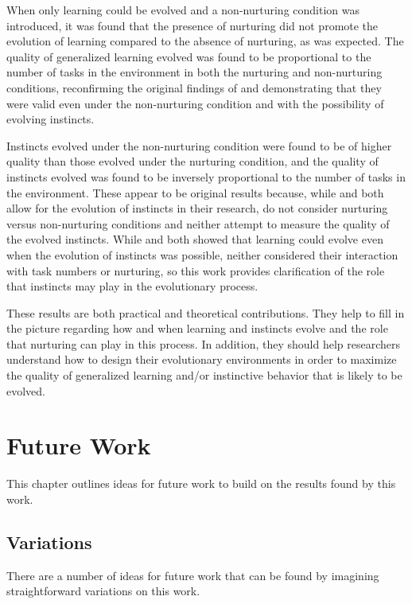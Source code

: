 \documentclass[master]{outhesis}
\begin{document}
When only learning could be evolved and a non-nurturing condition was introduced,
it was found that the presence of nurturing did not promote the evolution of learning compared to the absence of nurturing,
as was expected.
The quality of generalized learning evolved was found to be proportional to the number of tasks in the environment in both the nurturing and non-nurturing conditions,
reconfirming the original findings of \citet{Chalmers:1990aa} and demonstrating that they were valid even under the non-nurturing condition and with the possibility of evolving instincts.

Instincts evolved under the non-nurturing condition were found to be of higher quality than those evolved under the nurturing condition,
and the quality of instincts evolved was found to be inversely proportional to the number of tasks in the environment.
These appear to be original results because,
while \citet{Niv:2002aa} and \citet{Shah:2015hs} both allow for the evolution of instincts in their research,
\citeauthor{Niv:2002aa} do not consider nurturing versus non-nurturing conditions
and neither attempt to measure the quality of the evolved instincts.
While \citeauthor{Niv:2002aa} and \citeauthor{Shah:2015hs} both showed that learning could evolve even when the evolution of instincts was possible,
neither considered their interaction with task numbers or nurturing,
so this work provides clarification of the role that instincts may play in the evolutionary process.

These results are both practical and theoretical contributions.
They help to fill in the picture regarding how and when learning and instincts evolve and the role that nurturing can play in this process.
In addition, they should help researchers understand how to design their evolutionary environments in order to maximize the quality of generalized learning and/or instinctive behavior that is likely to be evolved.

\chapter{Future Work}

This chapter outlines ideas for future work to build on the results found by this work.

\section{Variations}

There are a number of ideas for future work that can be found by imagining straightforward variations on this work.
\end{document}
